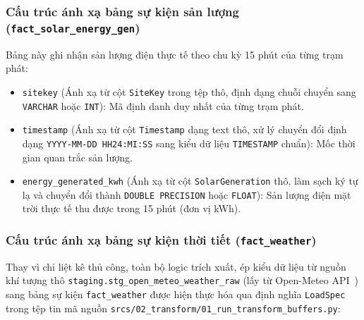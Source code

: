 \documentclass[12pt, a4paper]{report}
\begin{document}
\subsubsection{Cấu trúc ánh xạ bảng sự kiện sản lượng (\texttt{fact\_solar\_energy\_gen})}
Bảng này ghi nhận sản lượng điện thực tế theo chu kỳ 15 phút của từng trạm phát:
\begin{itemize}
    \item \texttt{sitekey} (Ánh xạ từ cột \texttt{SiteKey} trong tệp thô, định dạng chuỗi chuyển sang \texttt{VARCHAR} hoặc \texttt{INT}): Mã định danh duy nhất của từng trạm phát.
    \item \texttt{timestamp} (Ánh xạ từ cột \texttt{Timestamp} dạng text thô, xử lý chuyển đổi định dạng \texttt{YYYY-MM-DD HH24:MI:SS} sang kiểu dữ liệu \texttt{TIMESTAMP} chuẩn): Mốc thời gian quan trắc sản lượng.
    \item \texttt{energy\_generated\_kwh} (Ánh xạ từ cột \texttt{SolarGeneration} thô, làm sạch ký tự lạ và chuyển đổi thành \texttt{DOUBLE PRECISION} hoặc \texttt{FLOAT}): Sản lượng điện mặt trời thực tế thu được trong 15 phút (đơn vị kWh).
\end{itemize}

\subsubsection{Cấu trúc ánh xạ bảng sự kiện thời tiết (\texttt{fact\_weather})}
Thay vì chỉ liệt kê thủ công, toàn bộ logic trích xuất, ép kiểu dữ liệu từ nguồn khí tượng thô \texttt{staging.stg\_open\_meteo\_weather\_raw} (lấy từ Open-Meteo API~\cite{openmeteo2023}) sang bảng sự kiện \texttt{fact\_weather} được hiện thực hóa qua định nghĩa \texttt{LoadSpec} trong tệp tin mã nguồn \texttt{srcs/02\_transform/01\_run\_transform\_buffers.py}:
\end{document}
